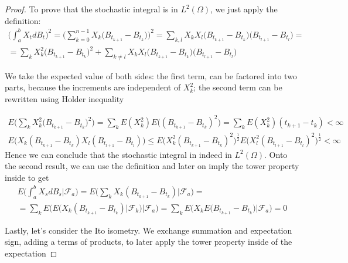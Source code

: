 \begin{proof}
    To prove that the stochastic integral is in $L^2(\Omega)$, we just apply the definition: 
    \begin{gather*}
        \Bigg( \int_a^b X_t d B_t \Bigg)^2 = \Bigg( \sum_{k=0}^{n-1} X_k \big( B_{t_{k+1}}-B_{t_k} \big) \Bigg)^2 = \sum_{k,l} X_k X_l \big( B_{t_{k+1}}-B_{t_k} \big) \big( B_{t_{l+1}}  - B_{t_l} \big) = \\ 
        = \sum_k X_k^2 \big(B_{t_{k+1}}-B_{t_k} \big)^2 + \sum_{k \neq l} X_k X_l \big( B_{t_{k+1}} -  B_{t_k} \big) \big( B_{t_{l+1}}-B_{t_l} \big)
    \end{gather*}

    We take the expected value of both sides: the first term, can be factored into two parts, because the increments are independent of $X_k^2$; the second term can be rewritten using Holder inequality

    \begin{gather*}
        E\Bigg( \sum_k X_k^2 \big(B_{t_{k+1}}-B_{t_k} \big)^2 \Bigg) = \sum_k E(X_k^2) E\Big( (B_{t_{k+1}}-B_{t_k} )^2\Big) = \sum_k E(X_k^2) (t_{k+1}-t_k) < \infty
    \end{gather*}
    \begin{gather*}
        E\Big( X_k (B_{t_{k+1}}-B_{t_k}) X_l (B_{t_{l+1}}-B_{t_l}) \Big) \leq E\Big( X_k^2 (B_{t_{k+1}}-B_{t_k})^2 \Big)^{\frac{1}{2}} E\Big( X_l^2 (B_{t_{l+1}}-B_{t_l})^2 \Big)^{\frac{1}{2}} < \infty
    \end{gather*}
    Hence we can conclude that the stochastic integral in indeed in $L^2(\Omega)$. Onto the second result, we can use the definition and later on imply the tower property inside to get
    \begin{gather*}
        E\Bigg( \int_a^b X_s d B_s \Big\vert \mathcal{F}_a \Bigg) = E\Bigg( \sum_k X_k (B_{t_{k+1}}-B_{t_k}) \Big\vert \mathcal{F}_a \Bigg) = \\
        = \sum_{k} E\Bigg( E\Big( X_k (B_{t_{k+1}} - B_{t_k}) \big\vert \mathcal{F}_k\Big)  \Big\vert \mathcal{F}_a  \Bigg) = \sum_k E\Bigg( X_k E\Big(B_{t_{k+1}} - B_{t_k}\Big)  \Big\vert \mathcal{F}_a  \Bigg) = 0
    \end{gather*}

    Lastly, let's consider the Ito isometry. We exchange summation and expectation sign, adding a terms of products, to later apply the tower property inside of the expectation


\end{proof}
